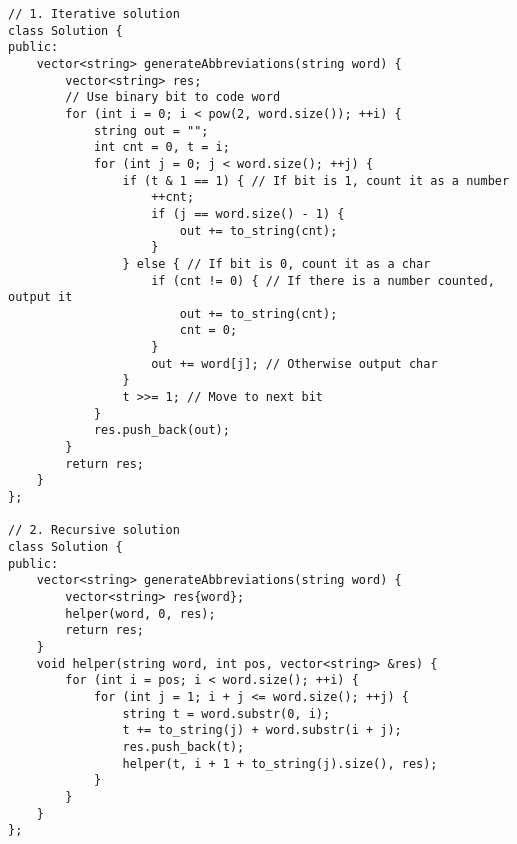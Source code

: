 \begin{lstlisting}
// 1. Iterative solution
class Solution {
public:
    vector<string> generateAbbreviations(string word) {
        vector<string> res;
        // Use binary bit to code word
        for (int i = 0; i < pow(2, word.size()); ++i) {
            string out = "";
            int cnt = 0, t = i;
            for (int j = 0; j < word.size(); ++j) {
                if (t & 1 == 1) { // If bit is 1, count it as a number
                    ++cnt;
                    if (j == word.size() - 1) {
                        out += to_string(cnt);
                    }
                } else { // If bit is 0, count it as a char
                    if (cnt != 0) { // If there is a number counted, output it
                        out += to_string(cnt);
                        cnt = 0;
                    }
                    out += word[j]; // Otherwise output char
                }
                t >>= 1; // Move to next bit
            }
            res.push_back(out);
        }
        return res;
    }
};

// 2. Recursive solution
class Solution {
public:
    vector<string> generateAbbreviations(string word) {
        vector<string> res{word};
        helper(word, 0, res);
        return res;
    }
    void helper(string word, int pos, vector<string> &res) {
        for (int i = pos; i < word.size(); ++i) {
            for (int j = 1; i + j <= word.size(); ++j) {
                string t = word.substr(0, i);
                t += to_string(j) + word.substr(i + j);
                res.push_back(t);
                helper(t, i + 1 + to_string(j).size(), res);
            }
        }
    }
};
\end{lstlisting}

